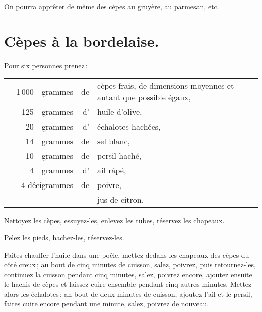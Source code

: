 \sk

On pourra apprêter de même des cèpes au gruyère, au parmesan, etc.

\section*{\centering Cèpes à la bordelaise.}
{}

Pour six personnes prenez :

\footnotesize
\begin{longtable}{rrrrp{16em}}
  &   1 000 & grammes & de & cèpes frais, de dimensions moyennes et autant que possible égaux,            \\
  &     125 & grammes & d' & huile d'olive,                                                               \\
  &      20 & grammes & d' & échalotes hachées,                                                           \\
  &      14 & grammes & de & sel blanc,                                                                   \\
  &      10 & grammes & de & persil haché,                                                                \\
  &       4 & grammes & d' & ail râpé,                                                                    \\
  & \multicolumn{2}{r}{4 décigrammes} & de & poivre,                                                      \\
  &         &         &    & jus de citron.                                                               \\
\end{longtable}
\normalsize

Nettoyez les cèpes, essuyez-les, enlevez les tubes, réservez les chapeaux.

Pelez les pieds, hachez-les, réservez-les.

Faites chauffer l'huile dans une poêle, mettez dedans les chapeaux des
cèpes du côté creux ; au bout de cinq minutes de cuisson, salez, poivrez,
puis retournez-les, continuez la cuisson pendant cinq minutes, salez, poivrez
encore, ajoutez ensuite le hachis de cèpes et laissez cuire ensemble pendant cinq
autres minutes. Mettez alors les échalotes ; an bout de deux minutes de cuisson,
ajoutez l'ail et le persil, faites cuire encore pendant une minute, salez, poivrez
de nouveau.

